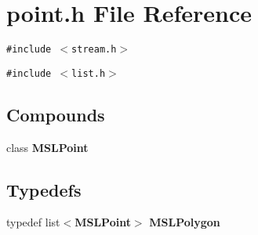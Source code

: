 \section{point.h File Reference}
\label{point_h}
{\tt \#include $<$stream.h$>$}\par
{\tt \#include $<$list.h$>$}\par
\subsection*{Compounds}
\begin{CompactItemize}
\item 
class {\bf MSLPoint}
\end{CompactItemize}
\subsection*{Typedefs}
\begin{CompactItemize}
\item 
typedef list$<${\bf MSLPoint}$>$ {\bf MSLPolygon}
\end{CompactItemize}
